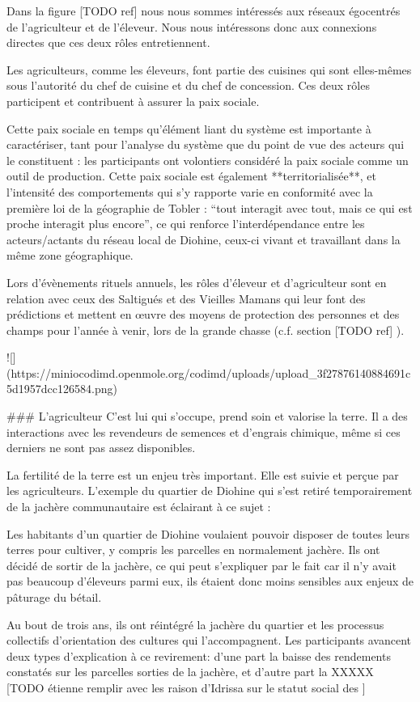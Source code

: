 Dans la figure [TODO ref] nous nous sommes intéressés aux réseaux égocentrés de l'agriculteur et de l'éleveur. Nous nous intéressons donc aux connexions directes que ces deux rôles entretiennent. 

Les agriculteurs, comme les éleveurs, font partie des cuisines qui sont elles-mêmes sous l'autorité du chef de cuisine et du chef de concession. Ces deux rôles participent et contribuent à assurer la paix sociale. 

Cette paix sociale en temps qu'élément liant du système est importante à caractériser, tant pour l'analyse du système que du point de vue des acteurs qui le constituent : les participants ont volontiers considéré la paix sociale comme un outil de production. Cette paix sociale est également **territorialisée**, et l'intensité des comportements qui s'y rapporte varie en conformité avec la première loi de la géographie de Tobler : “tout interagit avec tout, mais ce qui est proche interagit plus encore”, ce qui renforce l'interdépendance entre les acteurs/actants du réseau local de Diohine, ceux-ci vivant et travaillant dans la même zone géographique.

Lors d'évènements rituels annuels, les rôles d'éleveur et d'agriculteur sont en relation avec ceux des Saltigués et des Vieilles Mamans qui leur font des prédictions et mettent en œuvre des moyens de protection des personnes et des champs pour l'année à venir, lors de la grande chasse (c.f. section [TODO ref] ). 

![](https://miniocodimd.openmole.org/codimd/uploads/upload_3f27876140884691c5d1957dcc126584.png)

### L'agriculteur
C'est lui qui s'occupe, prend soin et valorise la terre. Il a des interactions avec les revendeurs de semences et d'engrais chimique, même si ces derniers ne sont pas assez disponibles. 

La fertilité de la terre est un enjeu très important. Elle est suivie et perçue par les agriculteurs. L'exemple du quartier de Diohine qui s'est retiré temporairement de la jachère communautaire est éclairant à ce sujet :  

Les habitants d'un quartier de Diohine voulaient pouvoir disposer de toutes leurs terres pour cultiver, y compris les parcelles en normalement jachère. Ils ont décidé de sortir de la jachère, ce qui peut s'expliquer par le fait car il n'y avait pas beaucoup d'éleveurs parmi eux, ils étaient donc moins sensibles aux enjeux de pâturage du bétail. 

Au bout de trois ans, ils ont réintégré la jachère du quartier et les processus collectifs d'orientation des cultures qui l'accompagnent.
Les participants avancent deux types d'explication à ce revirement: d'une part la baisse des rendements constatés sur les parcelles sorties de la jachère, et d'autre part la XXXXX [TODO étienne remplir avec les raison d'Idrissa sur le statut social des ]


